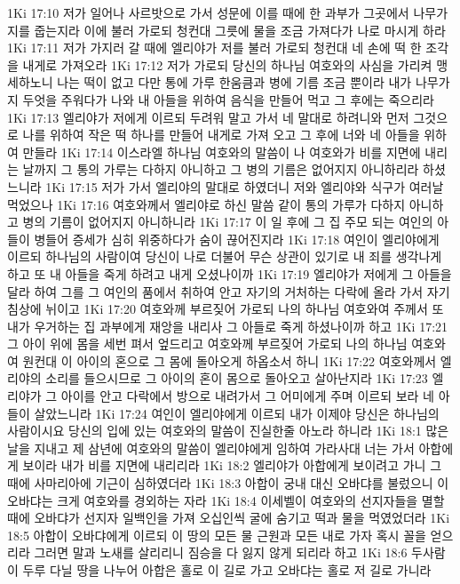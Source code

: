 1Ki 17:10  저가 일어나 사르밧으로 가서 성문에 이를 때에 한 과부가 그곳에서 나무가지를 줍는지라 이에 불러 가로되 청컨대 그릇에 물을 조금 가져다가 나로 마시게 하라
1Ki 17:11  저가 가지러 갈 때에 엘리야가 저를 불러 가로되 청컨대 네 손에 떡 한 조각을 내게로 가져오라
1Ki 17:12  저가 가로되 당신의 하나님 여호와의 사심을 가리켜 맹세하노니 나는 떡이 없고 다만 통에 가루 한움큼과 병에 기름 조금 뿐이라 내가 나무가지 두엇을 주워다가 나와 내 아들을 위하여 음식을 만들어 먹고 그 후에는 죽으리라
1Ki 17:13  엘리야가 저에게 이르되 두려워 말고 가서 네 말대로 하려니와 먼저 그것으로 나를 위하여 작은 떡 하나를 만들어 내게로 가져 오고 그 후에 너와 네 아들을 위하여 만들라
1Ki 17:14  이스라엘 하나님 여호와의 말씀이 나 여호와가 비를 지면에 내리는 날까지 그 통의 가루는 다하지 아니하고 그 병의 기름은 없어지지 아니하리라 하셨느니라
1Ki 17:15  저가 가서 엘리야의 말대로 하였더니 저와 엘리야와 식구가 여러날 먹었으나
1Ki 17:16  여호와께서 엘리야로 하신 말씀 같이 통의 가루가 다하지 아니하고 병의 기름이 없어지지 아니하니라
1Ki 17:17  이 일 후에 그 집 주모 되는 여인의 아들이 병들어 증세가 심히 위중하다가 숨이 끊어진지라
1Ki 17:18  여인이 엘리야에게 이르되 하나님의 사람이여 당신이 나로 더불어 무슨 상관이 있기로 내 죄를 생각나게 하고 또 내 아들을 죽게 하려고 내게 오셨나이까
1Ki 17:19  엘리야가 저에게 그 아들을 달라 하여 그를 그 여인의 품에서 취하여 안고 자기의 거처하는 다락에 올라 가서 자기 침상에 뉘이고
1Ki 17:20  여호와께 부르짖어 가로되 나의 하나님 여호와여 주께서 또 내가 우거하는 집 과부에게 재앙을 내리사 그 아들로 죽게 하셨나이까 하고
1Ki 17:21  그 아이 위에 몸을 세번 펴서 엎드리고 여호와께 부르짖어 가로되 나의 하나님 여호와여 원컨대 이 아이의 혼으로 그 몸에 돌아오게 하옵소서 하니
1Ki 17:22  여호와께서 엘리야의 소리를 들으시므로 그 아이의 혼이 몸으로 돌아오고 살아난지라
1Ki 17:23  엘리야가 그 아이를 안고 다락에서 방으로 내려가서 그 어미에게 주며 이르되 보라 네 아들이 살았느니라
1Ki 17:24  여인이 엘리야에게 이르되 내가 이제야 당신은 하나님의 사람이시요 당신의 입에 있는 여호와의 말씀이 진실한줄 아노라 하니라
1Ki 18:1  많은 날을 지내고 제 삼년에 여호와의 말씀이 엘리야에게 임하여 가라사대 너는 가서 아합에게 보이라 내가 비를 지면에 내리리라
1Ki 18:2  엘리야가 아합에게 보이려고 가니 그 때에 사마리아에 기근이 심하였더라
1Ki 18:3  아합이 궁내 대신 오바댜를 불렀으니 이 오바댜는 크게 여호와를 경외하는 자라
1Ki 18:4  이세벨이 여호와의 선지자들을 멸할 때에 오바댜가 선지자 일백인을 가져 오십인씩 굴에 숨기고 떡과 물을 먹였었더라
1Ki 18:5  아합이 오바댜에게 이르되 이 땅의 모든 물 근원과 모든 내로 가자 혹시 꼴을 얻으리라 그러면 말과 노새를 살리리니 짐승을 다 잃지 않게 되리라 하고
1Ki 18:6  두사람이 두루 다닐 땅을 나누어 아합은 홀로 이 길로 가고 오바댜는 홀로 저 길로 가니라

